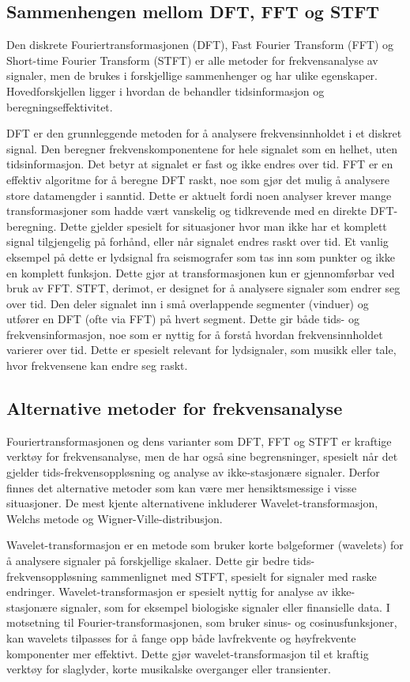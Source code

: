 \subsection{Sammenhengen mellom DFT, FFT og STFT}
Den diskrete Fouriertransformasjonen (DFT), Fast Fourier Transform (FFT) og Short-time Fourier Transform (STFT) er alle metoder for frekvensanalyse av signaler, 
men de brukes i forskjellige sammenhenger og har ulike egenskaper. Hovedforskjellen ligger i hvordan de behandler tidsinformasjon og beregningseffektivitet.

DFT er den grunnleggende metoden for å analysere frekvensinnholdet i et diskret signal. Den beregner frekvenskomponentene for hele signalet som en helhet, uten
tidsinformasjon. Det betyr at signalet er fast og ikke endres over tid. FFT er en effektiv algoritme for å beregne DFT raskt, noe som gjør det mulig å analysere 
store datamengder i sanntid. Dette er aktuelt fordi noen analyser krever mange transformasjoner som hadde vært vanskelig og tidkrevende med en direkte DFT-beregning.
Dette gjelder spesielt for situasjoner hvor man ikke har et komplett signal tilgjengelig på forhånd, eller når signalet endres raskt over tid. Et vanlig eksempel på 
dette er lydsignal fra seismografer som tas inn som punkter og ikke en komplett funksjon. Dette gjør at transformasjonen kun er gjennomførbar ved bruk av FFT. 
STFT, derimot, er designet for å analysere signaler som endrer seg over tid. Den deler signalet inn i små overlappende segmenter (vinduer) og utfører en DFT 
(ofte via FFT) på hvert segment. Dette gir både tids- og frekvensinformasjon, noe som er nyttig for å forstå hvordan frekvensinnholdet varierer over tid. Dette
er spesielt relevant for lydsignaler, som musikk eller tale, hvor frekvensene kan endre seg raskt.


\subsection{Alternative metoder for frekvensanalyse}
Fouriertransformasjonen og dens varianter som DFT, FFT og STFT er kraftige verktøy for frekvensanalyse, men de har også sine begrensninger, spesielt når det gjelder 
tids-frekvensoppløsning og analyse av ikke-stasjonære signaler. Derfor finnes det alternative metoder som kan være mer hensiktsmessige i visse situasjoner.
De mest kjente alternativene inkluderer Wavelet-transformasjon, Welchs metode og Wigner-Ville-distribusjon.

Wavelet-transformasjon er en metode som bruker korte bølgeformer (wavelets) for å analysere signaler på forskjellige skalaer. Dette gir bedre tids-frekvensoppløsning
sammenlignet med STFT, spesielt for signaler med raske endringer. Wavelet-transformasjon er spesielt nyttig for analyse av ikke-stasjonære signaler, som for eksempel 
biologiske signaler eller finansielle data. I motsetning til Fourier-transformasjonen, som bruker sinus- og cosinusfunksjoner, kan wavelets tilpasses for å fange opp 
både lavfrekvente og høyfrekvente komponenter mer effektivt. Dette gjør wavelet-transformasjon til et kraftig verktøy for slaglyder, korte musikalske overganger eller 
transienter. \parencite{holden_wavelets}

